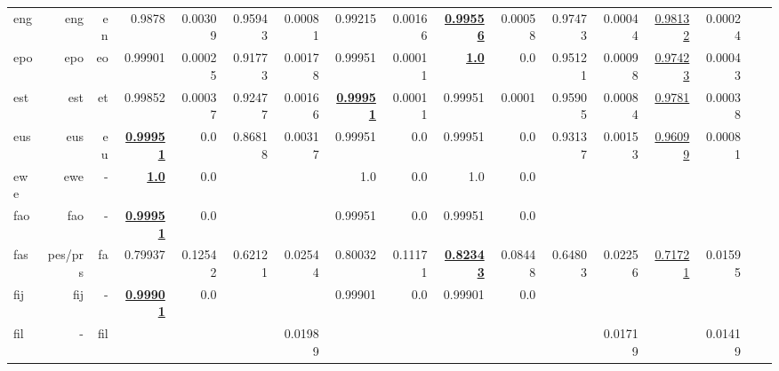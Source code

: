 \documentclass[11pt]{article}
\begin{document}
\begin{table*}[h]
{\begin{tabular}{lrrrrrrrrrrrrrrrr}
eng         & eng         & en         & 0.9878         & 0.00309         & 0.95943         & 0.00081         & 0.99215         & 0.00166         & \textbf{\underline{0.99556}}         & 0.00058         & 0.97473         & 0.00044         & \underline{0.98132}         & 0.00024         \\
epo         & epo         & eo         & 0.99901         & 0.00025         & 0.91773         & 0.00178         & 0.99951         & 0.00011         & \textbf{\underline{1.0}}         & 0.0         & 0.95121         & 0.00098         & \underline{0.97423}         & 0.00043         \\
est         & est         & et         & 0.99852         & 0.00037         & 0.92477         & 0.00166         & \textbf{\underline{0.99951}}         & 0.00011         & 0.99951         & 0.0001         & 0.95905         & 0.00084         & \underline{0.9781}         & 0.00038         \\
eus         & eus         & eu         & \textbf{\underline{0.99951}}         & 0.0         & 0.86818         & 0.00317         & 0.99951         & 0.0         & 0.99951         & 0.0         & 0.93137         & 0.00153         & \underline{0.96099}         & 0.00081         \\
ewe         & ewe         & -         & \textbf{\underline{1.0}}         & 0.0         &          &          & 1.0         & 0.0         & 1.0         & 0.0         &          &          &          &          \\
fao         & fao         & -         & \textbf{\underline{0.99951}}         & 0.0         &          &          & 0.99951         & 0.0         & 0.99951         & 0.0         &          &          &          &          \\
fas         & pes/prs         & fa         & 0.79937         & 0.12542         & 0.62121         & 0.02544         & 0.80032         & 0.11171         & \textbf{\underline{0.82343}}         & 0.08448         & 0.64803         & 0.02256         & \underline{0.71721}         & 0.01595         \\
fij         & fij         & -         & \textbf{\underline{0.99901}}         & 0.0         &          &          & 0.99901         & 0.0         & 0.99901         & 0.0         &          &          &          &          \\
fil         & -         & fil         &          &          &          & 0.01989         &          &          &          &          &          & 0.01719         &          & 0.01419         \\

\end{tabular}}
\end{table*}
\end{document}
